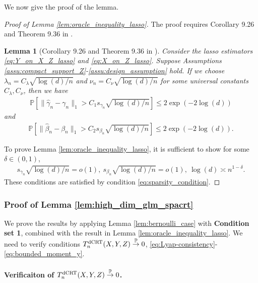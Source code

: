 \documentclass[12pt]{article}
\newtheorem{lemma}{Lemma}
\theoremstyle{definition}
\def\P{\mathbb{P}}
\def\P{\mathbb{P}}
\renewcommand{\P}{\mathbb{P}}							%
\newcommand{\convp}{\overset{\mathbb{P}}{\rightarrow}}             %
\newcommand{\srx}{X}									%
\newcommand{\srz}{Z}									%
\newcommand{\sry}{Y}									%
\newcommand{\dCRT}{\textnormal{dCRT}} 					%
\begin{document}
  \noindent We now give the proof of the lemma.
  \begin{proof}[Proof of Lemma \ref{lem:oracle_inequality_lasso}]
    The proof requires Corollary 9.26 and Theorem 9.36 in \citep{Wainwright2019}. 
    \begin{lemma}[Corollary 9.26 and Theorem 9.36 in \citep{Wainwright2019}]\label{lem:exponential_decay_lasso}
      Consider the lasso estimators \eqref{eq:Y_on_X_Z_lasso} and \eqref{eq:X_on_Z_lasso}. Suppose Assumptions \ref{assu:compact_support_Z}-\ref{assu:design_assumption} hold. If we choose $\lambda_n=C_{\lambda} \sqrt{\log(d)/n}$ and $\nu_n=C_{\nu}\sqrt{\log(d)/n}$ for some universal constants $C_\lambda,C_\nu$, then we have 
      \begin{align*}
        \P[\|\widehat{\gamma}_n-\gamma_n\|_1>C_{1}s_{\gamma_n}\sqrt{\log(d)/n}]\leq 2\exp(-2\log(d))
      \end{align*}
      and 
      \begin{align*}
        \P[\|\widehat{\beta}_n-\beta_n\|_1>C_{2}s_{\beta_n}\sqrt{\log(d)/n}]\leq 2\exp(-2\log(d)).
      \end{align*}
    \end{lemma}
    \noindent To prove Lemma \ref{lem:oracle_inequality_lasso}, it is sufficient to show for some $\delta\in (0,1)$,
    \begin{align*}
      s_{\gamma_n}\sqrt{\log(d)/n}=o(1),\ s_{\beta_n}\sqrt{\log(d)/n}=o(1),\ \log(d)\asymp n^{1-\delta}.
    \end{align*}
    These conditions are satisfied by condition \eqref{eq:sparsity_condition}.
  \end{proof}

  \subsubsection{Proof of Lemma \ref{lem:high_dim_glm_spacrt}}\label{sec:proof_lem_high_dim_glm_spacrt}


We prove the results by applying Lemma \ref{lem:bernoulli_case} with \textbf{Condition set 1}, combined with the result in Lemma \ref{lem:oracle_inequality_lasso}. We need to verify conditions $T_n^{\dCRT}(\srx,\sry,\srz)\convp 0$, \eqref{eq:Lyap-consistency}-\eqref{eq:bounded_moment_y}. 


\paragraph{Verificaiton of $T_n^{\dCRT}(\srx,\sry,\srz)\convp 0$.}
\end{document}
